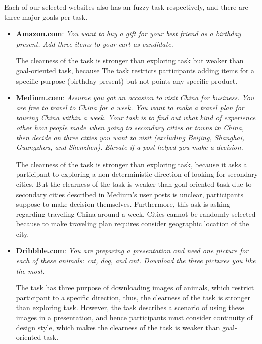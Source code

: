 Each of our selected websites also has an fuzzy task respectively, and there are three major goals per task.

\begin{itemize}
    \item \textbf{Amazon.com}: \emph{You want to buy a gift for your best friend as a birthday present.
        Add three items to your cart as candidate.}

        The clearness of the task is stronger than exploring task but weaker than goal-oriented task, because
        The task restricts participants adding items for a specific purpose (birthday present) but not points
        any specific product.

    \item \textbf{Medium.com}: \emph{Assume you got an occasion to visit China for business. 
        You are free to travel to China for a week. 
        You want to make a travel plan for touring China within a week. Your task is to find out what kind 
        of experience other how people made when going to secondary cities or towns in China, then decide 
        on three cities you want to visit (excluding  Beijing, Shanghai, Guangzhou, and Shenzhen). 
        Elevate if a post helped you make a decision.}

        The clearness of the task is stronger than exploring task, because it asks a participant 
        to exploring a non-deterministic direction of looking for secondary cities.
        But the clearness of the task is weaker than goal-oriented task due to secondary cities described
        in Medium's user posts is unclear, participants suppose to make decision themselves.
        Furthermore, this ask is asking regarding traveling China around a week. Cities cannot be randomly
        selected because to make traveling plan requires consider geographic location of the city.

    \item \textbf{Dribbble.com}: \emph{You are preparing a presentation and need one picture for each of these animals: 
    cat, dog, and ant. Download the three pictures you like the most.}

        The task has three purpose of downloading images of animals, which restrict participant to a specific direction,
        thus, the clearness of the task is stronger than exploring task. However, the task describes a scenario of using
        these images in a presentation, and hence participants must consider continuity of design style, which makes
        the clearness of the task is weaker than goal-oriented task. 
\end{itemize}

\cleardoublepage